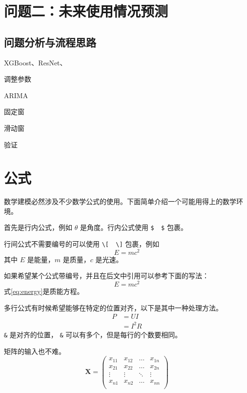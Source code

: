 \documentclass[withoutpreface,bwprint]{cumcmthesis}
\begin{document}
\newpage
\section{问题二：未来使用情况预测}

\subsection{问题分析与流程思路}



XGBoost、ResNet、

调整参数

ARIMA

固定窗

滑动窗

验证

\newpage
\section{公式}

数学建模必然涉及不少数学公式的使用。下面简单介绍一个可能用得上的数学环境。

首先是行内公式，例如 $ \theta $ 是角度。行内公式使用 \verb|$  $| 包裹。

行间公式不需要编号的可以使用 \verb|\[  \]| 包裹，例如
\[
    E=mc^2
\]
其中 $ E $ 是能量，$ m $ 是质量，$ c $ 是光速。

如果希望某个公式带编号，并且在后文中引用可以参考下面的写法：
\begin{equation}
    E=mc^2
    \label{eq:energy}
\end{equation}
式\cref{eq:energy}是质能方程。

多行公式有时候希望能够在特定的位置对齐，以下是其中一种处理方法。
\begin{align}
    P & = UI   \\
      & = I^2R
\end{align}
\verb|&| 是对齐的位置， \verb|&| 可以有多个，但是每行的个数要相同。

矩阵的输入也不难。
\[
    \mathbf{X} = \left(
    \begin{array}{cccc}
            x_{11} & x_{12} & \ldots & x_{1n} \\
            x_{21} & x_{22} & \ldots & x_{2n} \\
            \vdots & \vdots & \ddots & \vdots \\
            x_{n1} & x_{n2} & \ldots & x_{nn} \\
        \end{array} \right)
\]
\end{document}
